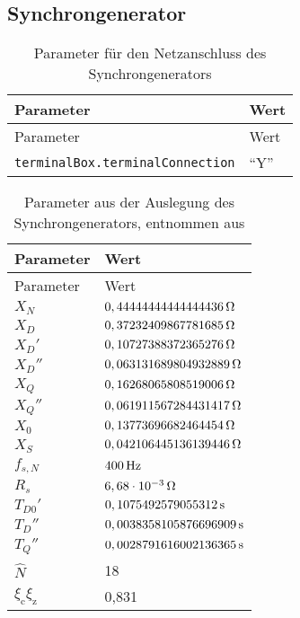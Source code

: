 \subsection{Synchrongenerator}\label{synchron-generator}

\begin{longtable}[]{@{}ll@{}}
\caption{Parameter für den Netzanschluss des Synchrongenerators} \label{tab:NetzSG}
\tabularnewline
\toprule
Parameter & Wert\tabularnewline
\midrule
\endfirsthead
\toprule
Parameter & Wert\tabularnewline
\midrule
\endhead
\texttt{terminalBox.terminalConnection} & ``Y''\tabularnewline
\bottomrule
\end{longtable}

\begin{longtable}[]{@{}ll@{}}
\caption{Parameter aus der Auslegung des Synchrongenerators, entnommen aus \cite{pillerpowersystemsTechnischeDatenSynchrongenerator,pillerpowersystemsWickelblattSynchrongenerator272004}} \label{tab:AuslegungSG}
\tabularnewline
\toprule
Parameter & Wert\tabularnewline
\midrule
\endfirsthead
\toprule
Parameter & Wert\tabularnewline
\midrule
\endhead
\(X_N\)     & \(\unit[0,44444444444444436]{\Omega}\)\tabularnewline
\(X_D\)     & \(\unit[0,37232409867781685]{\Omega}\)\tabularnewline
\(X_D'\)    & \(\unit[0,10727388372365276]{\Omega}\)\tabularnewline
\(X_D''\)   & \(\unit[0,063131689804932889]{\Omega}\)\tabularnewline
\(X_Q\)     & \(\unit[0,16268065808519006]{\Omega}\)\tabularnewline
\(X_Q''\)   & \(\unit[0,061911567284431417]{\Omega}\)\tabularnewline
\(X_0\)     & \(\unit[0,13773696682464454]{\Omega}\)\tabularnewline
\(X_S\)     & \(\unit[0,042106445136139446]{\Omega}\)\tabularnewline
\(f_{s,N}\) & \(\unit[400]{Hz}\)\tabularnewline
\(R_s\)     & \(\unit[6,68\cdot 10^{-3}]{\Omega}\)\tabularnewline
\(T_{D0}'\) & \(\unit[0,1075492579055312]{s}\)\tabularnewline
\(T_D''\)   & \(\unit[0,0038358105876696909]{s}\)\tabularnewline
\(T_Q''\)   & \(\unit[0,0028791616002136365]{s}\)\tabularnewline
$\hat N$    & 18 \tabularnewline
$\xi_\mathrm{c}\xi_\mathrm{z}$ & 0,831 \tabularnewline
\bottomrule
\end{longtable}

